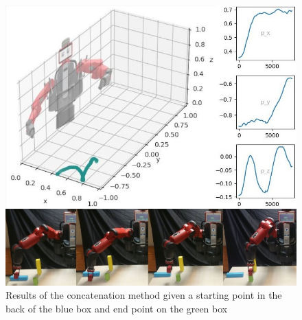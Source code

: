 \begin{figure}
    \centering
    \includegraphics[width=0.9\linewidth]{Images/con1-full.jpg}
    \caption{ Results of the concatenation method given a starting point in the back of the blue box and end point on the green box }
    \label{fig:con1-full}
\end{figure}


